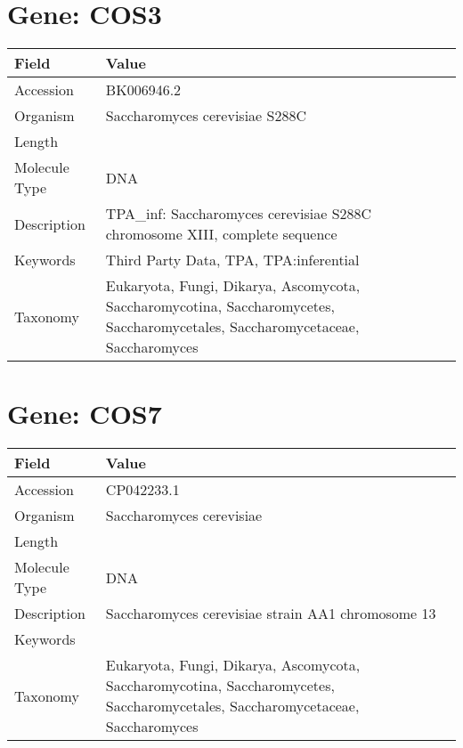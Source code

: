 \documentclass[10pt]{article}
\begin{document}
\section{Gene: COS3}
{\footnotesize
\begin{longtable}{>{\raggedright\arraybackslash}p{4.5cm} >{\raggedright\arraybackslash}p{11.5cm}}
\textbf{Field} & \textbf{Value} \\
\hline
Accession & BK006946.2 \\
Organism & Saccharomyces cerevisiae S288C \\
Length & 924431 \\
Molecule Type & DNA \\
Description & TPA\_inf: Saccharomyces cerevisiae S288C chromosome XIII, complete sequence \\
Keywords & Third Party Data, TPA, TPA:inferential \\
Taxonomy & Eukaryota, Fungi, Dikarya, Ascomycota, Saccharomycotina, Saccharomycetes, Saccharomycetales, Saccharomycetaceae, Saccharomyces \\
\end{longtable}
}

\vspace{1em}
\section{Gene: COS7}
{\footnotesize
\begin{longtable}{>{\raggedright\arraybackslash}p{4.5cm} >{\raggedright\arraybackslash}p{11.5cm}}
\textbf{Field} & \textbf{Value} \\
\hline
Accession & CP042233.1 \\
Organism & Saccharomyces cerevisiae \\
Length & 918755 \\
Molecule Type & DNA \\
Description & Saccharomyces cerevisiae strain AA1 chromosome 13 \\
Keywords &  \\
Taxonomy & Eukaryota, Fungi, Dikarya, Ascomycota, Saccharomycotina, Saccharomycetes, Saccharomycetales, Saccharomycetaceae, Saccharomyces \\
\end{longtable}
}

\vspace{1em}
\end{document}
